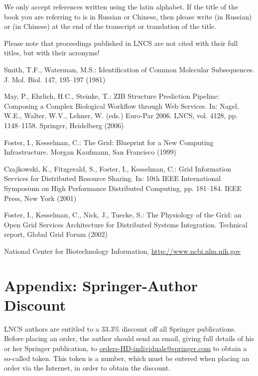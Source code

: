 \documentclass[runningheads,a4paper]{llncs}
\begin{document}
We only accept references written using the latin alphabet. If the title
of the book you are referring to is in Russian or Chinese, then please write
(in Russian) or (in Chinese) at the end of the transcript or translation
of the title.

Please note that proceedings published in LNCS are not cited with their
full titles, but with their acronyms!

\begin{thebibliography}{4}

 Smith, T.F., Waterman, M.S.: Identification of Common Molecular
Subsequences. J. Mol. Biol. 147, 195--197 (1981)

 May, P., Ehrlich, H.C., Steinke, T.: ZIB Structure Prediction Pipeline:
Composing a Complex Biological Workflow through Web Services. In: Nagel,
W.E., Walter, W.V., Lehner, W. (eds.) Euro-Par 2006. LNCS, vol. 4128,
pp. 1148--1158. Springer, Heidelberg (2006)

 Foster, I., Kesselman, C.: The Grid: Blueprint for a New Computing
Infrastructure. Morgan Kaufmann, San Francisco (1999)

 Czajkowski, K., Fitzgerald, S., Foster, I., Kesselman, C.: Grid
Information Services for Distributed Resource Sharing. In: 10th IEEE
International Symposium on High Performance Distributed Computing, pp.
181--184. IEEE Press, New York (2001)

 Foster, I., Kesselman, C., Nick, J., Tuecke, S.: The Physiology of the
Grid: an Open Grid Services Architecture for Distributed Systems
Integration. Technical report, Global Grid Forum (2002)

 National Center for Biotechnology Information, \url{http://www.ncbi.nlm.nih.gov}

\end{thebibliography}


\section*{Appendix: Springer-Author Discount}

LNCS authors are entitled to a 33.3\% discount off all Springer
publications. Before placing an order, the author should send an email, 
giving full details of his or her Springer publication,
to \url{orders-HD-individuals@springer.com} to obtain a so-called token. This token is a
number, which must be entered when placing an order via the Internet, in
order to obtain the discount.
\end{document}
